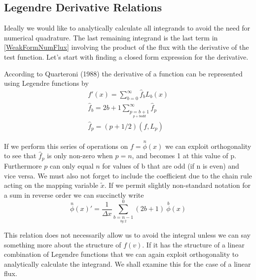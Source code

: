 \documentclass[letterpaper]{article}
\begin{document}
\subsection{Legendre Derivative Relations}
Ideally we would like to analytically calculate all integrands to avoid the need for numerical quadrature. The last remaining integrand is the last term in \eqref{WeakFormNumFlux} involving the product of the flux with the derivative of the test function. Let's start with finding a closed form expression for the derivative.

According to Quarteroni (1988) the derivative of a function can be represented using Legendre functions by
	\begin{gather*}\label{Quarteroni}
	f'(x) = \sum_{b=0}^\infty \hat{f}_b L_b(x)\\
	\hat{f}_b = 2b+1 \sum_{\underset{p+b odd}{p=b+1}}^\infty \hat{f}_p\\
	\hat{f}_p = (p+1/2) (f,L_p)
	\end{gather*}

If we perform this series of operations on $f=\overset{n}{\phi}(x)$ we can exploit orthogonality to see that $\hat{f}_p$ is only non-zero when $p=n$, and becomes 1 at this value of p. Furthermore $p$ can only equal $n$ for values of b that are odd (if n is even) and vice versa. We must also not forget to include the coefficient due to the chain rule acting on the mapping variable $\tilde{x}$. If we permit slightly non-standard notation for a sum in reverse order we can succinctly write
	\begin{equation}\label{DerivativeLeg}
	\overset{n}{\phi}(x)' = \frac{1}{\Delta x} \sum_{\underset{by \; 2}{b=n-1}}^0 (2b+1) \:\overset{b}{\phi}(x)
	\end{equation}

This relation does not necessarily allow us to avoid the integral unless we can say something more about the structure of $f(v)$. If it has the structure of a linear combination of Legendre functions that we can again exploit orthogonality to analytically calculate the integrand. We shall examine this for the case of a linear flux.
\end{document}
